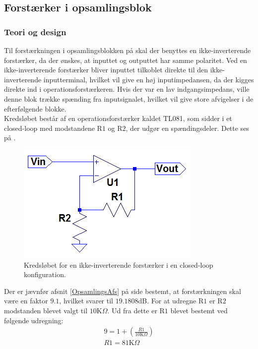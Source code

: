 \subsection{Forstærker i opsamlingsblok}\label{Subsec:Forstaerker}
\subsubsection{Teori og design}
Til forstærkningen i opsamlingsblokken på  skal der benyttes en ikke-inverterende forstærker, da der ønskes, at inputtet og outputtet har samme polaritet. Ved en ikke-inverterende forstærker bliver inputtet tilkoblet direkte til den ikke-inverterende inputterminal, hvilket vil give en høj inputimpedansen, da der kigges direkte ind i operationsforstærkeren. Hvis der var en lav indgangsimpedans, ville denne blok trække spænding fra inputsignalet, hvilket vil give store afvigelser i de efterfølgende blokke. \\
Kredsløbet består af en operationsforstærker kaldet TL081, som sidder i et closed-loop med modstandene R$1$ og R$2$, der udgør en spændingsdeler. Dette ses på .
\begin{figure}[H]
\centering
\includegraphics[scale=0.75]{figures/cProblemloesning/Forstaerker.PNG}
\caption{Kredsløbet for en ikke-inverterende forstærker i en closed-loop konfiguration.}
\label{fig:Forstaerker}
\end{figure} 

\noindent Der er jævnfør afsnit \ref{OpsamlingsAfs} på side \pageref{OpsamlingsAfs} bestemt, at forstærkningen skal være en faktor $9.1$, hvilket svarer til $19.1808$dB. For at udregne R$1$ er R$2$ modstanden blevet valgt til $10$K$\Omega$. Ud fra dette er R$1$ blevet bestemt ved følgende udregning:
\begin{align}
9 = 1 + (\frac{R1}{10\text{K}\Omega})\\
R1 = 81\text{K}\Omega
\end{align}


